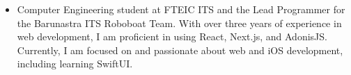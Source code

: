 \begin{itemize}[leftmargin=0.15in, label={}]
    \item{
     {Computer Engineering student at FTEIC ITS and the Lead Programmer for the Barunastra ITS Roboboat Team. With over three years of experience in web development, I am proficient in using React, Next.js, and AdonisJS. Currently, I am focused on and passionate about web and iOS development, including learning SwiftUI.}
    }
    \vspace{-6pt}
\end{itemize}